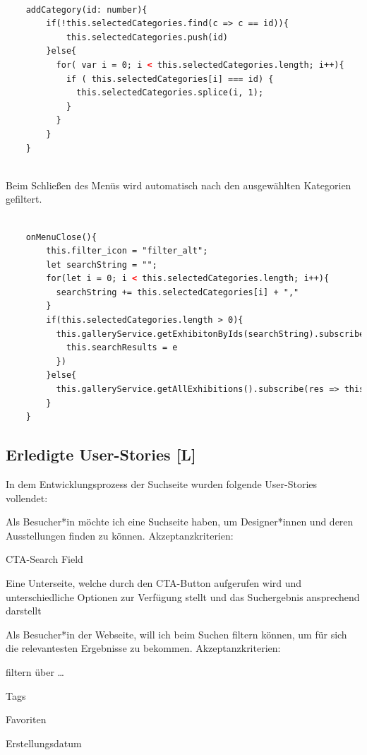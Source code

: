 \begin{lstlisting}[caption={Auswählen und Abwählen der Kategorien},language=HTML]

    addCategory(id: number){
        if(!this.selectedCategories.find(c => c == id)){
            this.selectedCategories.push(id)
        }else{
          for( var i = 0; i < this.selectedCategories.length; i++){
            if ( this.selectedCategories[i] === id) {
              this.selectedCategories.splice(i, 1);
            }
          }
        }
    }
        
\end{lstlisting}

Beim Schließen des Menüs wird automatisch nach den ausgewählten Kategorien gefiltert.


\begin{lstlisting}[caption={Filter von Kategorien anwenden},language=HTML]

    onMenuClose(){
        this.filter_icon = "filter_alt";
        let searchString = "";
        for(let i = 0; i < this.selectedCategories.length; i++){
          searchString += this.selectedCategories[i] + ","
        }
        if(this.selectedCategories.length > 0){
          this.galleryService.getExhibitonByIds(searchString).subscribe(e => {
            this.searchResults = e
          })
        }else{
          this.galleryService.getAllExhibitions().subscribe(res => this.searchResults = res);
        }
    }
\end{lstlisting}



\subsection{Erledigte User-Stories [L]}
In dem Entwicklungsprozess der Suchseite wurden folgende User-Stories vollendet:
\begin{compactitem}
  \item Als Besucher*in möchte ich eine Suchseite haben, um Designer*innen und deren Ausstellungen finden zu können. Akzeptanzkriterien:
    \begin{compactitem}
        \item CTA-Search Field
        \item Eine Unterseite, welche durch den CTA-Button aufgerufen wird und unterschiedliche Optionen zur Verfügung stellt und das Suchergebnis ansprechend darstellt
    \end{compactitem}
    \item  Als Besucher*in der Webseite, will ich beim Suchen filtern können, um für sich die relevantesten Ergebnisse zu bekommen. Akzeptanzkriterien:
    \begin{compactitem}
        \item filtern über …
        \begin{compactitem}
            \item Tags
            \item Favoriten
            \item Erstellungsdatum
        \end{compactitem}
    \end{compactitem}
\end{compactitem}